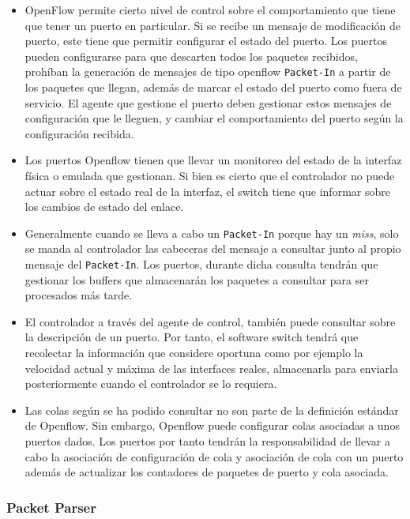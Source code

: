 \begin{itemize}
    \item OpenFlow permite cierto nivel de control sobre el comportamiento que tiene que tener un puerto en particular. Si se recibe un mensaje de modificación de puerto, este tiene que permitir configurar el estado del puerto. Los puertos pueden configurarse para que descarten todos los paquetes recibidos, prohíban la generación de mensajes de tipo openflow \texttt{Packet-In} a partir de los paquetes que llegan, además de marcar el estado del puerto como fuera de servicio. El agente que gestione el puerto deben gestionar estos mensajes de configuración que le lleguen, y cambiar el comportamiento del puerto según la configuración recibida.

    \item Los puertos Openflow tienen que llevar un monitoreo del estado de la interfaz física o emulada que gestionan. Si bien es cierto que el controlador no puede actuar sobre el estado real de la interfaz, el switch tiene que informar sobre los cambios de estado del enlace.

    \item  Generalmente cuando se lleva a cabo un \texttt{Packet-In} porque hay un \textit{miss}, solo se manda al controlador las cabeceras del mensaje a consultar junto al propio mensaje del \texttt{Packet-In}. Los puertos, durante dicha consulta tendrán que gestionar los buffers que almacenarán los paquetes a consultar para ser procesados más tarde.

    \item El controlador a través del agente de control, también puede consultar sobre la descripción de un puerto. Por tanto, el software switch tendrá que recolectar la información que considere oportuna como por ejemplo la velocidad actual y máxima de las interfaces reales, almacenarla para enviarla posteriormente cuando el controlador se lo requiera.

    \item Las colas según se ha podido consultar no son parte de la definición estándar de Openflow. Sin embargo, Openflow puede  configurar colas asociadas a unos puertos dados. Los puertos por tanto tendrán la responsabilidad de llevar a cabo la asociación de configuración de cola y asociación de cola con un puerto además de actualizar los contadores de paquetes de puerto y cola asociada.
\end{itemize}

\subsubsection{Packet Parser}

